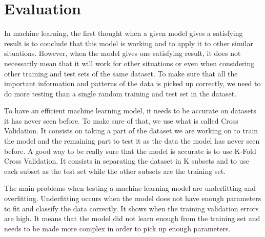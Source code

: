\documentclass[conference]{IEEEtran}
\begin{document}


\section{Evaluation}
\textcolor{baptiste}{In machine learning, the first thought when a given model gives a satisfying result is to conclude that this model is working and to apply it to other similar situations. However, when the model gives one satisfying result, it does not necessarily mean that it will work for other situations or even when considering other training and test sets of the same dataset. To make sure that all the important information and patterns of the data is picked up correctly, we need to do more testing than a single random training and test set in the dataset.}

\textcolor{baptiste}{To have an efficient machine learning model, it needs to be accurate on datasets it has never seen before. To make sure of that, we use what is called Cross Validation. It consists on taking a part of the dataset we are working on to train the model and the remaining part to test it as the data the model has never seen before.
A good way to be really sure that the model is accurate is to use K-Fold Cross Validation. It consists in separating the dataset in K subsets and to use each subset as the test set while the other subsets are the training set. 
}


\textcolor{baptiste}{The main problems when testing a machine learning model are underfitting and overfitting. Underfitting occurs when the model does not have enough parameters to fit and classify the data correctly. It shows when the training validation errors are high. It means that the model did not learn enough from the training set and needs to be made more complex in order to pick up enough parameters.}
\end{document}
